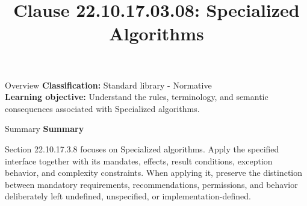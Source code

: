 \documentclass[10pt,letterpaper]{article}
\title{Clause 22.10.17.03.08: Specialized Algorithms}
\author{}
\date{}
\begin{document}
\maketitle
\begin{CornellOverviewBox}{Overview}
\textbf{Classification:} Standard library - Normative\\[2pt]
\textbf{Learning objective:} Understand the rules, terminology, and semantic consequences associated with Specialized algorithms.
\end{CornellOverviewBox}\begin{CornellSummaryBox}{Summary}
{\sffamily\bfseries\color{Accent} Summary}\par\vspace{3pt}Section 22.10.17.3.8 focuses on Specialized algorithms. Apply the specified interface together with its mandates, effects, result conditions, exception behavior, and complexity constraints. When applying it, preserve the distinction between mandatory requirements, recommendations, permissions, and behavior deliberately left undefined, unspecified, or implementation-defined.
\end{CornellSummaryBox}
\end{document}
